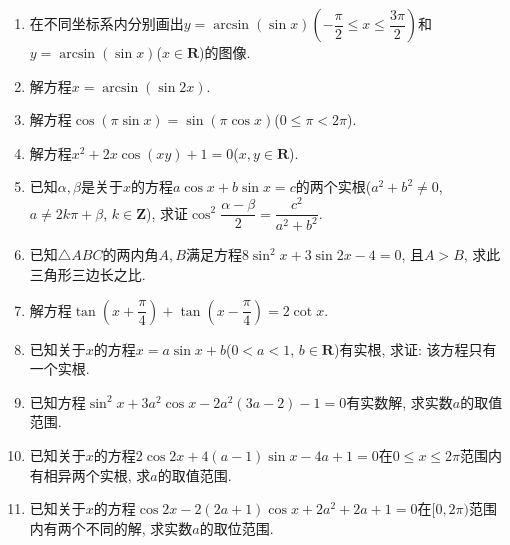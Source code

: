 \documentclass[10pt,a4paper]{article}
\begin{document}
\begin{enumerate}[1.]
\item 在不同坐标系内分别画出$y=\arcsin (\sin x)(-\dfrac{\pi }2\le x\le \dfrac{3\pi }2)$和$y=\arcsin (\sin x)$($x\in \mathbf{R}$)的图像.
\item 解方程$x=\arcsin (\sin 2x)$.
\item 解方程$\cos (\pi \sin x)=\sin (\pi \cos x)$($0\le \pi <2\pi$).
\item 解方程$x^2+2x\cos (xy)+1=0$($x,y\in \mathbf{R}$).
\item 已知$\alpha ,\beta$是关于$x$的方程$a\cos x+b\sin x=c$的两个实根($a^2+b^2\ne 0$, $a\ne 2k\pi +\beta$, $k\in \mathbf{Z}$), 求证$\cos ^2\dfrac{\alpha -\beta}2=\dfrac{c^2}{a^2+b^2}$.
\item 已知$\triangle ABC$的两内角$A,B$满足方程$8\sin ^2x+3\sin 2x-4=0$, 且$A>B$, 求此三角形三边长之比.
\item 解方程$\tan (x+\dfrac{\pi }4)+\tan (x-\dfrac{\pi }4)=2\cot x$.
\item 已知关于$x$的方程$x=a\sin x+b$($0<a<1$, $b\in \mathbf{R}$)有实根, 求证: 该方程只有一个实根.
\item 已知方程$\sin ^2x+3a^2\cos x-2a^2(3a-2)-1=0$有实数解, 求实数$a$的取值范围.
\item 已知关于$x$的方程$2\cos 2x+4(a-1)\sin x-4a+1=0$在$0\le x\le 2\pi$范围内有相异两个实根, 求$a$的取值范围.
\item 已知关于$x$的方程$\cos 2x-2(2a+1)\cos x+2a^2+2a+1=0$在$[0,2\pi)$范围内有两个不同的解, 求实数$a$的取位范围.

\end{enumerate}
\end{document}
